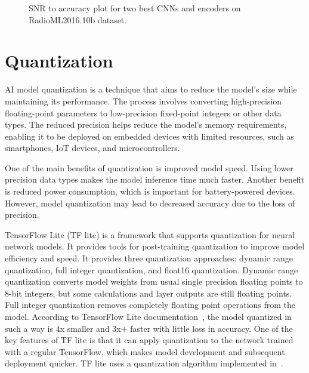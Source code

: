 \begin{figure}[h!]
    \begin{center}
        
    \end{center}
    \caption{SNR to accuracy plot for two best CNNs and encoders on RadioML2016.10b dataset.}
    \label{fig:snr_to_acc_radioML_b}
\end{figure}


\section{Quantization} \label{quantization}

AI model quantization is a technique that aims to reduce the model's size while maintaining its performance. The process involves converting high-precision floating-point parameters to low-precision fixed-point integers or other data types. The reduced precision helps reduce the model's memory requirements, enabling it to be deployed on embedded devices with limited resources, such as smartphones, IoT devices, and microcontrollers.

One of the main benefits of quantization is improved model speed. Using lower precision data types makes the model inference time much faster. Another benefit is reduced power consumption, which is important for battery-powered devices. However, model quantization may lead to decreased accuracy due to the loss of precision.

TensorFlow Lite (TF lite) is a framework that supports quantization for neural network models. It provides tools for post-training quantization to improve model efficiency and speed. It provides three quantization approaches: dynamic range quantization, full integer quantization, and float16 quantization. Dynamic range quantization converts model weights from usual single precision floating points to 8-bit integers, but some calculations and layer outputs are still floating points. Full integer quantization removes completely floating point operations from the model. According to TensorFlow Lite documentation~\cite{tf_lite_quantization}, the model quantized in such a way is 4x smaller and 3x+ faster with little loss in accuracy. One of the key features of TF lite is that it can apply quantization to the network trained with a regular TensorFlow, which makes model development and subsequent deployment quicker. TF lite uses a quantization algorithm implemented in~\cite{gemmlowp}.

